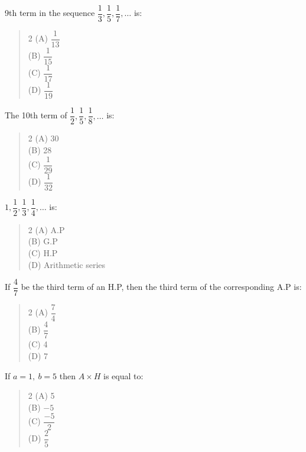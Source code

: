 \documentclass[11pt,a4paper]{article}
\begin{document}
\begin{mcqlist}
\item 9th term in the sequence $\dfrac{1}{3},\dfrac{1}{5},\dfrac{1}{7},\ldots$ is:
\begin{quote}\begin{multicols}{2}
\noindent (A) $\dfrac{1}{13}$ \\
(B) $\dfrac{1}{15}$ \\
(C) $\dfrac{1}{17}$ \\
(D) $\dfrac{1}{19}$
\end{multicols}\end{quote}

\item The 10th term of $\dfrac{1}{2},\dfrac{1}{5},\dfrac{1}{8},\ldots$ is:
\begin{quote}\begin{multicols}{2}
\noindent (A) 30 \\
(B) 28 \\
(C) $\dfrac{1}{29}$ \\
(D) $\dfrac{1}{32}$
\end{multicols}\end{quote}

\item $1,\dfrac{1}{2},\dfrac{1}{3},\dfrac{1}{4},\ldots$ is:
\begin{quote}\begin{multicols}{2}
\noindent (A) A.P \\
(B) G.P \\
(C) H.P \\
(D) Arithmetic series
\end{multicols}\end{quote}

\item If $\dfrac{4}{7}$ be the third term of an H.P, then the third term of the corresponding A.P is:
\begin{quote}\begin{multicols}{2}
\noindent (A) $\dfrac{7}{4}$ \\
(B) $\dfrac{4}{7}$ \\
(C) 4 \\
(D) 7
\end{multicols}\end{quote}

\item If $a=1,\ b=5$ then $A\times H$ is equal to:
\begin{quote}\begin{multicols}{2}
\noindent (A) 5 \\
(B) $-5$ \\
(C) $\dfrac{-5}{2}$ \\
(D) $\dfrac{2}{5}$
\end{multicols}\end{quote}


\end{mcqlist}
\end{document}
